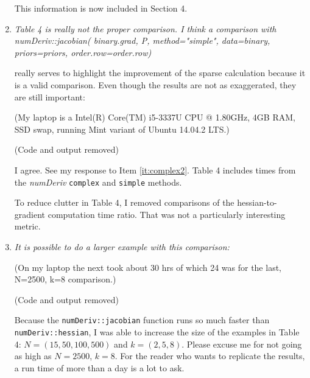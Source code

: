 \documentclass{article}
\newcommand{\pkg}[1]{\emph{#1}}
\newcommand{\code}[1]{\texttt{#1}}
\newcommand{\func}[1]{\code{#1}}
\newcommand{\method}[1]{\func{#1}}
\newenvironment{revQuote}{\itshape}{\vspace{\baselineskip}}
\newenvironment{response}{\normalfont}{\vspace{\baselineskip}}
\begin{document}
\begin{enumerate}[align=left]
\begin{response}
  This information is now included in Section 4.
\end{response}


\item\begin{revQuote}
Table 4 is really not the proper comparison. I think a comparison with
       numDeriv::jacobian( binary.grad, P, method="simple", 
                   data=binary, priors=priors,
order.row=order.row)

really serves to highlight the improvement of the sparse calculation because
it is a valid comparison. Even though the results are not as exaggerated,
they are still important:

(My laptop is a  Intel(R) Core(TM) i5-3337U CPU @ 1.80GHz,  4GB RAM, SSD
swap, running Mint variant of Ubuntu 14.04.2 LTS.)

(Code and output removed)
  \end{revQuote}
  
  \begin{response}
    I agree.  See my response to Item \ref{it:complex2}.  Table 4
    includes times from the \pkg{numDeriv}
    \method{complex} and \method{simple} methods.

    To reduce clutter in Table 4, I removed comparisons of the
    hessian-to-gradient computation time ratio.  That was not a
    particularly interesting metric.
    
  \end{response}

\item\begin{revQuote}
It is possible to do a larger example with this comparison:

(On my laptop the next took about 30 hrs of which 24 was for the last,
N=2500, k=8 comparison.)

(Code and output removed)

  \end{revQuote}
  
  \begin{response}
Because the \func{numDeriv::jacobian} function runs so much faster
than  \func{numDeriv::hessian}, I was able to increase the size of the
examples in Table 4: $N=(15, 50, 100, 500)$ and $k=(2,5,8)$. Please
excuse me for not going as high as $N=2500$, $k=8$. For the reader
who wants to replicate the results, a run time of more than a day is a
lot to ask.
  \end{response}


\end{enumerate}
\end{document}
